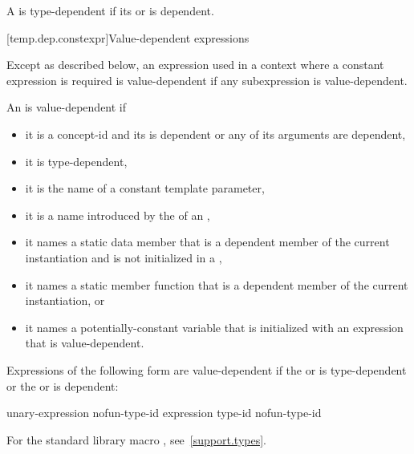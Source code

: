 \pnum
A  is type-dependent
if its  or
is dependent.

[temp.dep.constexpr]{Value-dependent expressions}

\pnum
Except as described below, an expression used in a context where a
constant expression is required is value-dependent if any
subexpression is value-dependent.

\pnum
An
is value-dependent if
\begin{itemize}
\item
it is a concept-id and
its  is dependent or
any of its arguments are dependent,
\item
it is type-dependent,
\item
it is the name of a constant template parameter,
\item
it is a name introduced by the 
of an ,
\item
it names a static data member that is a dependent member of the current
instantiation and is not initialized in a ,
\item
it names a static member function that is a dependent member of the current
instantiation, or
\item
it names a potentially-constant variable
that is initialized with an expression that is value-dependent.
\end{itemize}

Expressions of the following form are value-dependent if the
 or 
is type-dependent or the
or 
is dependent:

\begin{ncsimplebnf}
 unary-expression\br
{} \terminal{(} nofun-type-id \terminal{)}\br
{} \terminal{(} expression \terminal{)}\br
{} \terminal{(} type-id \terminal{)}\br
{} \terminal{(} nofun-type-id \terminal{)}
\end{ncsimplebnf}

\begin{note}
For the standard library macro ,
see~\ref{support.types}.
\end{note}

